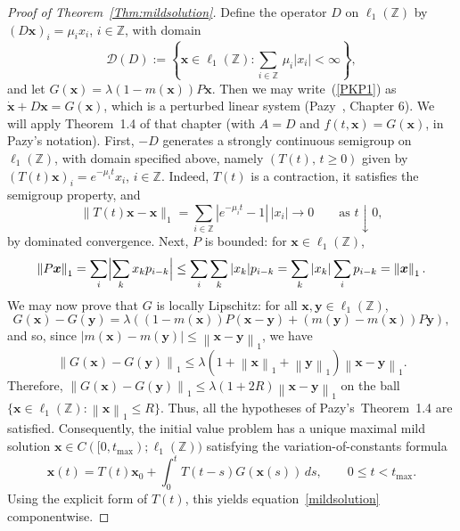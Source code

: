 \documentclass[12pt]{article}
\newcommand{\Z}{\ensuremath{\mathbb Z}}
\newcommand\D{\ensuremath{\mathcal{D}}}
\newcommand{\by}{\boldsymbol{y}}
\newcommand{\norm}[1]{\left\lVert #1 \right\rVert}
\newcommand{\BS}{\ensuremath{\ell_1(\Z)}}
\newcommand{\ts}{\textstyle}
\newcommand{\bx}{\boldsymbol{x}}
\begin{document}
\begin{proof}[Proof of Theorem~\ref{Thm:mildsolution}]
Define the operator $D$ on $\BS$ by $(D\bx)_i=\mu_i x_i$,
$i\in\Z$, with domain
$$
\D(D) :=\left\{\bx\in\BS: {\ts\sum_{i\in\Z}}\,\mu_i|x_i|<\infty\right\},
$$
and let $G(\bx)=\lambda(1-m(\bx))P\bx$. Then we may write~(\ref{PKP1}) as
$\dot{\bx}+D\bx=G(\bx)$, which is a perturbed linear system
(Pazy~\cite{Paz83}, Chapter 6). We will apply Theorem~1.4 of that
chapter (with $A=D$ and $f(t,\bx)=G(\bx)$, in Pazy's notation). First,
$-D$ generates a strongly continuous semigroup on $\BS$, with
domain specified above, namely
$(T(t),\, t\geq 0)$ given by $(T(t)\bx)_i=e^{-\mu_i t} x_i$, $i\in \Z$.
Indeed, $T(t)$ is a contraction, it satisfies the semigroup property,
and
$$
\|T(t)\bx-\bx\|_1 =\sum_{i\in\mathbb Z} |e^{-\mu_i t}-1|\,|x_i| \to 0 
\qquad\text{as }t\downarrow 0,
$$
by dominated convergence. Next, $P$ is bounded: for $\bx\in \BS$,
$$
\norm{P\bx}_1
=\sum_i\Bigl|\sum_k x_k p_{i-k}\Bigr|
\leq \sum_i\sum_k |x_k| p_{i-k}
=\sum_k |x_k|\sum_i p_{i-k}
=\norm{\bx}_1.
$$
We may now prove that $G$ is locally Lipschitz: for all 
$\bx,\by\in \BS$,
$$
G(\bx)-G(\by) = \lambda \left( (1-m(\bx)) P(\bx-\by) +
(m(\by)-m(\bx))P\by \right),
$$ 
and so, since 
$|m(\bx)-m(\by)|\leq \norm{\bx-\by}_1$, we have 
$$
\norm{G(\bx)-G(\by)}_1 
\leq \lambda (1 + \norm{\bx}_1 + \norm{\by}_1)\norm{\bx-\by}_1.
$$
Therefore, $\norm{G(\bx)-G(\by)}_1 \leq \lambda (1 +
2R)\norm{\bx-\by}_1$ on the ball $\{\bx\in \BS: \norm{\bx}_1\leq
R\}$. 
Thus, all the hypotheses of Pazy's~Theorem~1.4 are satisfied.
Consequently, the initial value problem has a unique maximal mild
solution $\bx\in C([0,t_{\max});\BS)$ satisfying the
variation-of-constants formula 
\begin{equation}
\bx(t) = T(t)\bx_0+\int_0^tT(t-s)G(\bx(s))\,ds, \qquad 0\leq t<t_{\max}.
\label{vofc}
\end{equation}
Using the explicit form of $T(t)$, this yields equation~\eqref{mildsolution}
componentwise.
\end{proof}
\end{document}
